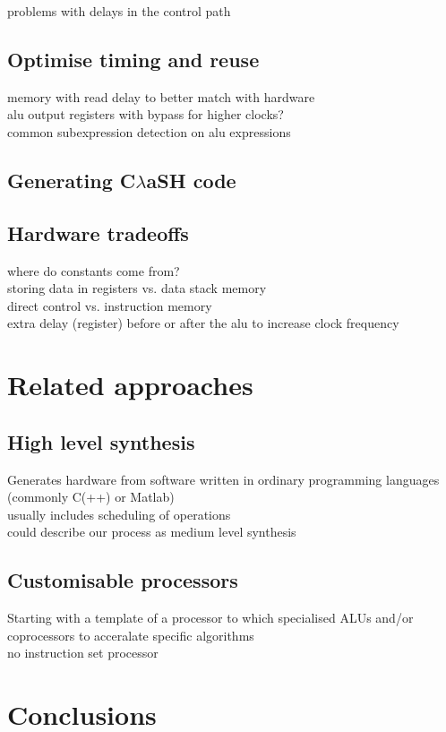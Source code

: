 \documentclass[preprint]{sigplanconf}
\def\clash{C$\lambda$aSH\xspace}
\begin{document}
problems with delays in the control path

\subsection{Optimise timing and reuse}
memory with read delay to better match with hardware \\
alu output registers with bypass for higher clocks? \\
common subexpression detection on alu expressions

\subsection{Generating \clash code}

\subsection{Hardware tradeoffs}
where do constants come from? \\
storing data in registers vs. data stack memory \\
direct control vs. instruction memory \\
extra delay (register) before or after the alu to increase clock frequency

\section{Related approaches}

\subsection{High level synthesis}
Generates hardware from software written in ordinary programming languages (commonly C(++) or Matlab)\\
usually includes scheduling of operations \\
could describe our process as medium level synthesis

\subsection{Customisable processors}
Starting with a template of a processor to which specialised ALUs and/or coprocessors to acceralate specific algorithms \\
no instruction set processor 

\section{Conclusions}
\end{document}
